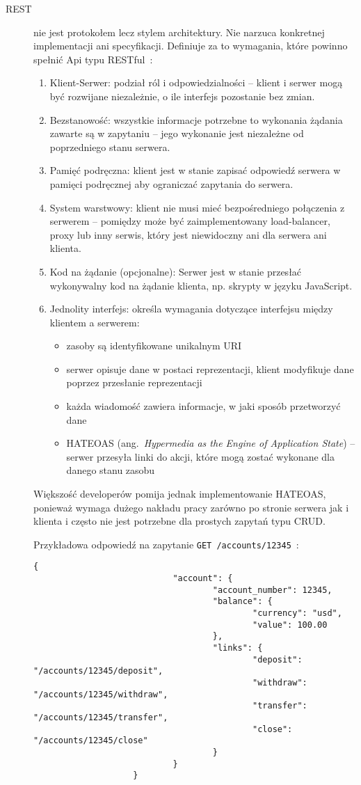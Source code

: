 \begin{description}
			\item[REST] nie jest protokołem lecz stylem architektury.
				Nie narzuca konkretnej implementacji ani specyfikacji. Definiuje za to wymagania, które powinno spełnić Api typu RESTful~\cite{RESTful}:
				\begin{enumerate}
					\item Klient-Serwer: podział ról i odpowiedzialności -- klient i serwer mogą być rozwijane niezależnie, o ile interfejs pozostanie bez zmian.
					\item Bezstanowość: wszystkie informacje potrzebne to wykonania żądania zawarte są w zapytaniu -- jego wykonanie jest niezależne od poprzedniego stanu serwera.
					\item Pamięć podręczna: klient jest w stanie zapisać odpowiedź serwera w pamięci podręcznej aby ograniczać zapytania do serwera.
					\item System warstwowy: klient nie musi mieć bezpośredniego połączenia z serwerem
						-- pomiędzy może być zaimplementowany load-balancer, proxy lub inny serwis, który jest niewidoczny ani dla serwera ani klienta.
					\item Kod na żądanie (opcjonalne): Serwer jest w stanie przesłać wykonywalny kod na żądanie klienta, np. skrypty w języku JavaScript.
					\item Jednolity interfejs: określa wymagania dotyczące interfejsu między klientem a serwerem:
						\begin{itemize}
							\item zasoby są identyfikowane unikalnym URI
							\item serwer opisuje dane w postaci reprezentacji, klient modyfikuje dane poprzez przesłanie reprezentacji
							\item każda wiadomość zawiera informacje, w jaki sposób przetworzyć dane
							\item HATEOAS (ang.\ \emph{Hypermedia as the Engine of Application State})
								-- serwer przesyła linki do akcji, które mogą zostać wykonane dla danego stanu zasobu
						\end{itemize}
				\end{enumerate}

				Większość developerów pomija jednak implementowanie HATEOAS, ponieważ wymaga dużego nakładu pracy zarówno po stronie serwera jak i klienta
				i często nie jest potrzebne dla prostych zapytań typu CRUD.

				Przykładowa odpowiedź na zapytanie \verb|GET /accounts/12345|~\cite{RestMsg}:
				\begin{lstlisting}[label=lst:restRes]
					{
							"account": {
									"account_number": 12345,
									"balance": {
											"currency": "usd",
											"value": 100.00
									},
									"links": {
											"deposit": "/accounts/12345/deposit",
											"withdraw": "/accounts/12345/withdraw",
											"transfer": "/accounts/12345/transfer",
											"close": "/accounts/12345/close"
									}
							}
					}
				\end{lstlisting}
				

\end{description}
